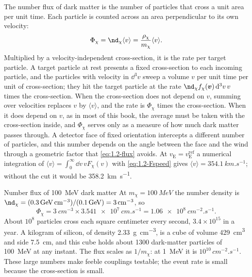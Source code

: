 The number flux of dark matter is the number of particles that cross a unit area per unit time. Each particle is counted across an area perpendicular to its own velocity:
\begin{equation}
  \Phi_\chi = \nd_\chi \langle v \rangle = \frac{\rho_\chi}{m_\chi}\langle v\rangle.
  \label{eq:1.2-flux}
\end{equation}
Multiplied by a velocity-independent cross-section, it is the rate per target particle. A target particle at rest presents a fixed cross-section to each incoming particle, and the particles with velocity in $\dd^3 v$ sweep a volume $v$ per unit time per unit of cross-section; they hit the target particle at the rate $\nd_\chi f_\chi(\vect{v})\,\dd^3 v\, v$ times the cross-section. When the cross-section does not depend on $v$, summing over velocities replaces $v$ by $\langle v\rangle$, and the rate is $\Phi_\chi$ times the cross-section. When it does depend on $v$, as in most of this book, the average must be taken with the cross-section inside, and $\Phi_\chi$ serves only as a measure of how much dark matter passes through. A detector face of fixed orientation intercepts a different number of particles, and this number depends on the angle between the face and the wind through a geometric factor that \cref{eq:1.2-flux} avoids. At $v_{\mathrm{E}} = v_{\mathrm{E}}^{\mathrm{ref}}$ a numerical integration of $\langle v\rangle = \int_0^\infty \dd v\, v F_\chi(v)$ with \cref{eq:1.2-Fspeed} gives $\langle v\rangle = \SI{354.1}{km.s^{-1}}$; without the cut it would be \SI{358.2}{km.s^{-1}}.

\begin{workedexample}{Number flux of \SI{100}{MeV} dark matter}\label{we:1-flux}
At $m_\chi = \SI{100}{MeV}$ the number density is $\nd_\chi = (\SI{0.3}{GeV.cm^{-3}})/(\SI{0.1}{GeV}) = \SI{3}{cm^{-3}}$, so
\begin{equation*}
  \Phi_\chi = \SI{3}{cm^{-3}} \times \SI{3.541e7}{cm.s^{-1}} = \SI{1.06e8}{cm^{-2}.s^{-1}}.
\end{equation*}
About $10^8$ particles cross each square centimeter every second, $3.4\times10^{15}$ in a year. A kilogram of silicon, of density \SI{2.33}{g.cm^{-3}}, is a cube of volume \SI{429}{cm^3} and side \SI{7.5}{cm}, and this cube holds about 1300 dark-matter particles of \SI{100}{MeV} at any instant. The flux scales as $1/m_\chi$: at \SI{1}{MeV} it is $10^{10}\,\si{cm^{-2}.s^{-1}}$. These large numbers make feeble couplings testable; the event rate is small because the cross-section is small.
\end{workedexample}

